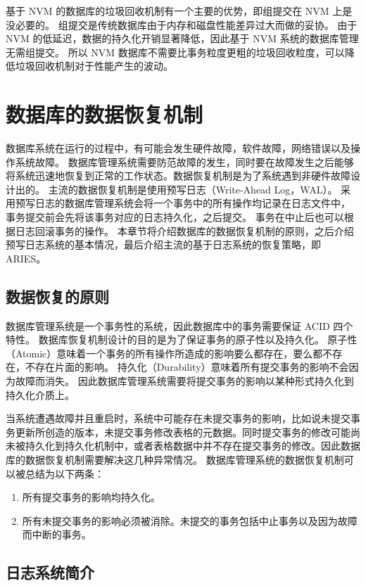 基于 NVM 的数据库的垃圾回收机制有一个主要的优势，即组提交在 NVM 上是没必要的。
组提交是传统数据库由于内存和磁盘性能差异过大而做的妥协。
由于 NVM 的低延迟，数据的持久化开销显著降低，因此基于 NVM 系统的数据库管理无需组提交。
所以 NVM 数据库不需要比事务粒度更粗的垃圾回收粒度，可以降低垃圾回收机制对于性能产生的波动。


\section{数据库的数据恢复机制}

数据库系统在运行的过程中，有可能会发生硬件故障，软件故障，网络错误以及操作系统故障。
数据库管理系统需要防范故障的发生，同时要在故障发生之后能够将系统迅速地恢复到正常的工作状态。数据恢复机制是为了系统遇到非硬件故障设计出的。
主流的数据恢复机制是使用预写日志（Write-Ahead Log，WAL）。
采用预写日志的数据库管理系统会将一个事务中的所有操作均记录在日志文件中，
事务提交前会先将该事务对应的日志持久化，之后提交。
事务在中止后也可以根据日志回滚事务的操作。
本章节将介绍数据库的数据恢复机制的原则，之后介绍预写日志系统的基本情况，最后介绍主流的基于日志系统的恢复策略，即 ARIES。

\subsection{数据恢复的原则}

数据库管理系统是一个事务性的系统，因此数据库中的事务需要保证 ACID 四个特性。
数据库恢复机制设计的目的是为了保证事务的原子性以及持久化。
原子性（Atomic）意味着一个事务的所有操作所造成的影响要么都存在，要么都不存在，不存在片面的影响。
持久化（Durability）意味着所有提交事务的影响不会因为故障而消失。
因此数据库管理系统需要将提交事务的影响以某种形式持久化到持久化介质上。

当系统遭遇故障并且重启时，系统中可能存在未提交事务的影响，比如说未提交事务更新所创造的版本，未提交事务修改表格的元数据。同时提交事务的修改可能尚未被持久化到持久化机制中，或者表格数据中并不存在提交事务的修改。因此数据库的数据恢复机制需要解决这几种异常情况。
数据库管理系统的数据恢复机制可以被总结为以下两条：
\begin{enumerate}
    \item 所有提交事务的影响均持久化。
    \item 所有未提交事务的影响必须被消除。未提交的事务包括中止事务以及因为故障而中断的事务。
\end{enumerate}


\subsection{日志系统简介}

